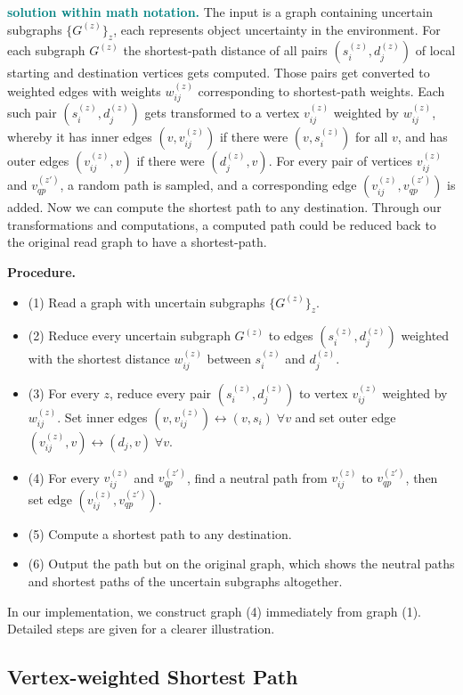 \textcolor{teal}{\textbf{solution within math notation.}} The input is a graph containing uncertain subgraphs $\{G^{(z)}\}_z$, each represents object uncertainty in the environment. For each subgraph $G^{(z)}$ the shortest-path distance of all pairs $(s_i^{(z)}, d_j^{(z)})$ of local starting and destination vertices gets computed. Those pairs get converted to weighted edges with weights $w_{ij}^{(z)}$ corresponding to shortest-path weights. Each such pair $(s_i^{(z)}, d_j^{(z)})$ gets transformed to a vertex $v_{ij}^{(z)}$ weighted by $w_{ij}^{(z)}$, whereby it has inner edges $(v, v_{ij}^{(z)})$ if there were $(v, s_i^{(z)})$ for all $v$, and has outer edges $(v_{ij}^{(z)}, v)$ if there were $(d_j^{(z)}, v)$. For every pair of vertices $v_{ij}^{(z)}$ and $v_{qp}^{(z')}$, a random path is sampled, and a corresponding edge $(v_{ij}^{(z)}, v_{qp}^{(z')})$ is added. Now we can compute the shortest path to any destination. Through our transformations and computations, a computed path could be reduced back to the original read graph to have a shortest-path.

\textbf{Procedure.}
\begin{itemize}
    \item (1) Read a graph with uncertain subgraphs $\{G^{(z)} \}_z$.
    \item (2) Reduce every uncertain subgraph $G^{(z)}$ to edges $(s_i^{(z)}, d_j^{(z)})$ weighted with the shortest distance $w_{ij}^{(z)}$ between $s_i^{(z)}$ and $d_j^{(z)}$.
    \item (3) For every $z$, reduce every pair $(s_i^{(z)}, d_j^{(z)})$ to vertex $v_{ij}^{(z)}$ weighted by $w_{ij}^{(z)}$. Set inner edges $(v,v_{ij}^{(z)}) \longleftrightarrow (v, s_i) \; \forall v$ and set outer edge $(v_{ij}^{(z)}, v) \longleftrightarrow (d_j, v) \; \forall v$.
    \item (4) For every $v_{ij}^{(z)}$ and $v_{qp}^{(z')}$, find a neutral path from $v_{ij}^{(z)}$ to $v_{qp}^{(z')}$, then set edge $(v_{ij}^{(z)}, v_{qp}^{(z')})$.
    \item (5) Compute a shortest path to any destination.
    \item (6) Output the path but on the original graph, which shows the neutral paths and shortest paths of the uncertain subgraphs altogether.
\end{itemize}

In our implementation, we construct graph (4) immediately from graph (1). Detailed steps are given for a clearer illustration.


\subsection{Vertex-weighted Shortest Path}

